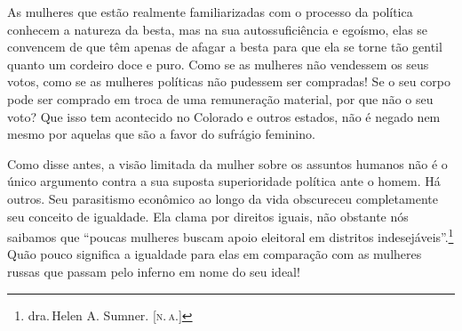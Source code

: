 As mulheres que estão realmente familiarizadas com o processo da
política conhecem a natureza da besta, mas na sua autossuficiência e
egoísmo, elas se convencem de que têm apenas de afagar a besta para que
ela se torne tão gentil quanto um cordeiro doce e puro. Como se as
mulheres não vendessem os seus votos, como se as mulheres políticas não
pudessem ser compradas! Se o seu corpo pode ser comprado em troca de uma
remuneração material, por que não o seu voto? Que isso tem acontecido no
Colorado e outros estados, não é negado nem mesmo por aquelas que são a
favor do sufrágio feminino.

Como disse antes, a visão limitada da mulher sobre os assuntos humanos
não é o único argumento contra a sua suposta superioridade política ante
o homem. Há outros. Seu parasitismo econômico ao longo da vida
obscureceu completamente seu conceito de igualdade. Ela clama por
direitos iguais, não obstante nós saibamos que ``poucas mulheres buscam
apoio eleitoral em distritos indesejáveis''.\footnote{dra.\,Helen A.
  Sumner. [\textsc{n.\,a.}]} Quão pouco significa a igualdade para elas em
comparação com as mulheres russas que passam pelo inferno em nome do seu
ideal!\label{russas}

